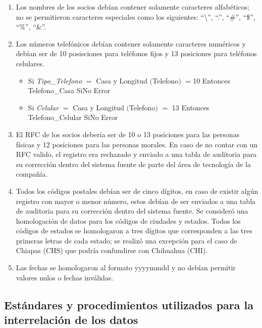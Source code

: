 \begin{enumerate}

\item Los nombres de los socios debían contener solamente caracteres
  alfabéticos; no se permitieron caracteres especiales como los siguientes:
  ``\textbackslash'', ``.'', ``\#'', ``\$'', ``\%'', ``\&''.

\item Los números telefónicos debían contener solamente caracteres numéricos y
  debían ser de 10 posisciones para teléfonos fijos y 13 posiciones para
  teléfonos celulares.

  \begin{itemize}
  \item Si \textit{Tipo\_Telefono} $=$ Casa y Longitud $($Telefono$)$ $=$10
    Entonces Telefono\_Casa SiNo Error
  \item Si \textit{Celular} $=$ Casa y Longitud $($Telefono$)$ $=$ 13 Entonces
    Telefono\_Celular SiNo Error
  \end{itemize}

\item El RFC de los socios debería ser de 10 o 13 posiciones para las personas
  físicas y 12 posiciones para las personas morales. En caso de no contar con un
  RFC valido, el registro era rechazado y enviado a una tabla de auditoria para
  su corrección dentro del sistema fuente de parte del área de tecnología de la
  compañía.

\item Todos los códigos postales debían ser de cinco dígitos, en caso de existir
  algún registro con mayor o menor número, estos debían de ser enviados a una
  tabla de auditoria para su corrección dentro del sistema fuente. Se consideró
  una homologación de datos para los códigos de ciudades y estados. Todos los
  códigos de estados se homologaron a tres dígitos que corresponden a las tres
  primeras letras de cada estado; se realizó una excepción para el caso de
  Chiapas (CHS) que podría confundirse con Chihuahua (CHI).

\item Las fechas se homologaron al formato yyyymmdd y no debían permitir valores
  nulos o fechas inválidas.

\end{enumerate}

\subsection{Estándares y procedimientos utilizados para la interrelación de los datos}

